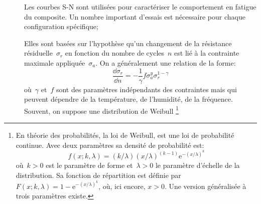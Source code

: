 \begin{description}
  \item[] Les courbes S-N sont utilisées
     pour caractériser le comportement en fatigue du composite.
     Un nombre important d'essais est nécessaire pour chaque
     configuration spécifique;

  \item[]
     Elles sont basées sur l'hypothèse qu'un changement de la
     résistance résiduelle~$\sigma_r$ en fonction du nombre de
     cycles~$n$ est lié à la contrainte maximale appliquée~$\sigma_a$.
     On a généralement une relation de la forme:
     \begin{equation}
      \dfrac{\dd \sigma_r}{\dd n} = -\dfrac1\gamma f\sigma_a^y
      \sigma_r^{1-\gamma}
     \end{equation}
     où~$\gamma$ et~$f$ sont des paramètres indépendants des
     contraintes mais qui peuvent dépendre de la température, de
     l'humidité, de la fréquence.
     Souvent, on suppose une distribution
    de Weibull
\footnote{En théorie des probabilités, la loi de Weibull, est une loi de probabilité continue. Avec deux paramètres sa densité de probabilité est:
\begin{equation*}  f(x;k,\lambda) = (k/\lambda) (x/\lambda)^{(k-1)} \mathrm{e}^{-(x/\lambda)^k}\end{equation*}
où~$k > 0$ est le paramètre de forme et~$\lambda > 0$ le paramètre
d'échelle de la distribution.
Sa fonction de répartition est définie par
$  F(x;k,\lambda) = 1- \mathrm{e}^{-(x/\lambda)^k}$,
où, ici encore, $x > 0$.
\medskipvm
Une version généralisée à trois paramètres existe.

}
\end{description}
